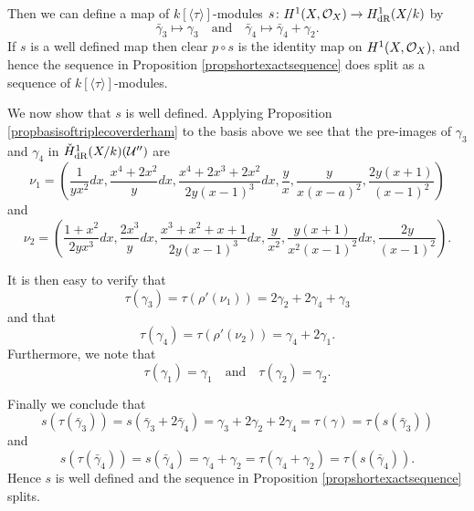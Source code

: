 \begin{ex}
    Then we can define a map of $k[\langle \tau \rangle]$-modules $s \colon H^1(X,\mathcal{O}_X) \rightarrow H_{\text {dR}}^1(X/k)$ by
        \[
        \bar \gamma_3 \mapsto \gamma_3 \quad \text{and} \quad \bar \gamma_4 \mapsto \bar \gamma_4 + \gamma_2.
        \]
    If $s$ is a well defined map then clear $p \circ s$ is the identity map on $H^1(X,\mathcal{O}_X)$, and hence the sequence in Proposition \ref{propshortexactsequence} does split as a sequence of $k[\langle \tau \rangle]$-modules.

    We now show that $s$ is well defined.
    Applying Proposition \ref{propbasisoftriplecoverderham} to the basis above we see that the pre-images of $\gamma_3$ and $\gamma_4$ in $\check{H}_{\text {dR}}^1(X/k)({\mathcal U}'')$ are
        \[
        \nu_1 = \left(\frac{1}{yx^2}dx, \frac{x^4+2x^2}{y}dx, \frac{x^4+2x^3+2x^2}{2y(x-1)^3}dx, \frac{y}{x}, \frac{y}{x(x-a)^2}, \frac{2y(x+1)}{(x-1)^2} \right)
        \]
    and
        \[
        \nu_2 = \left( \frac{1+x^2}{2yx^3}dx, \frac{2x^3}{y}dx, \frac{x^3+x^2+x+1}{2y(x-1)^3}dx, \frac{y}{x^2}, \frac{y(x+1)}{x^2(x-1)^2}dx, \frac{2y}{(x-1)^2} \right).
        \]
    
    It is then easy to verify that
        \[
        \tau(\gamma_3) = \tau (\rho'(\nu_1)) = 2\gamma_2 + 2\gamma_4 + \gamma_3
        \]
    and that
        \[
        \tau(\gamma_4) = \tau(\rho'(\nu_2)) = \gamma_4 + 2 \gamma_1.
        \]
    Furthermore, we note that
        \[
        \tau(\gamma_1) = \gamma_1 \quad \text{and} \quad \tau(\gamma_2) = \gamma_2.
        \]

    Finally we conclude that
        \[
        s(\tau(\bar\gamma_3)) = s(\bar\gamma_3 + 2\bar \gamma_4) = \gamma_3 + 2\gamma_2 + 2\gamma_4 = \tau(\gamma) = \tau(s(\bar\gamma_3))
        \]
    and
        \[
        s(\tau(\bar\gamma_4)) = s(\bar\gamma_4) = \gamma_4 + \gamma_2 = \tau(\gamma_4 + \gamma_2)  = \tau(s(\bar\gamma_4)).
        \]
    Hence $s$ is well defined and the sequence in Proposition \ref{propshortexactsequence} splits.
    \end{ex}



